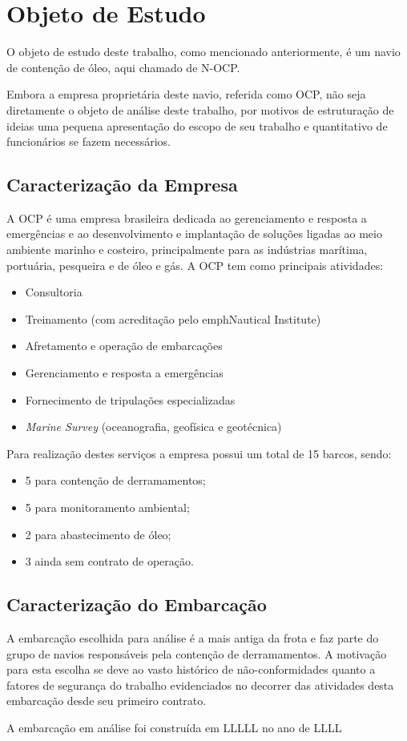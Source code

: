 \chapter{Objeto de Estudo}
O objeto de estudo deste trabalho, como mencionado anteriormente, é um navio de contenção de óleo, aqui chamado de N-OCP. 

Embora a empresa proprietária deste navio, referida como OCP, não seja diretamente o objeto de análise deste trabalho, por motivos de estruturação de ideias uma pequena apresentação do escopo de seu trabalho e quantitativo de funcionários se fazem necessários.

\section{Caracterização da Empresa}
A OCP é uma empresa brasileira dedicada ao gerenciamento e resposta a emergências e ao desenvolvimento e implantação de soluções ligadas ao meio ambiente marinho e costeiro, principalmente para as indústrias marítima, portuária, pesqueira e de óleo e gás.
A OCP tem como principais atividades:
\begin{itemize}
\item Consultoria
\item Treinamento (com acreditação pelo emph{Nautical Institute})
\item Afretamento e operação de embarcações
\item Gerenciamento e resposta a emergências
\item Fornecimento de tripulações especializadas
\item \emph{Marine Survey} (oceanografia, geofísica e geotécnica)
\end{itemize}

Para realização destes serviços a empresa possui um total de 15 barcos, sendo:
\begin{itemize}
\item 5 para contenção de derramamentos;
\item 5 para monitoramento ambiental;
\item 2 para abastecimento de óleo;
\item 3 ainda sem contrato de operação.
\end{itemize}

\section{Caracterização do Embarcação}
A embarcação escolhida para análise é a mais antiga da frota e faz parte do grupo de navios responsáveis pela contenção de derramamentos. A motivação para esta escolha se deve ao vasto histórico de não-conformidades quanto a fatores de segurança do trabalho evidenciados no decorrer das atividades desta embarcação desde seu primeiro contrato.

A embarcação em análise foi construída em LLLLL no ano de LLLL